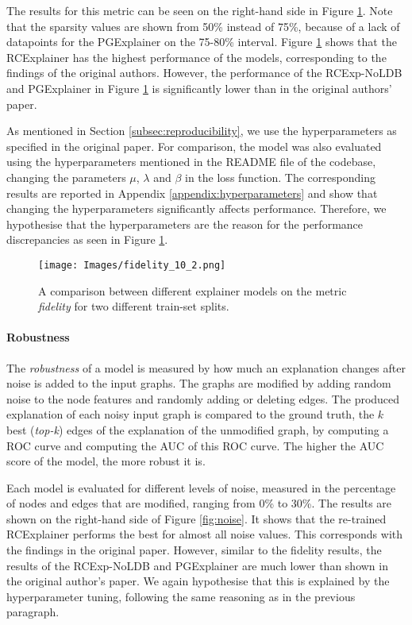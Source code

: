The results for this metric can be seen on the right-hand side in Figure \ref{fig:fidelity}. Note that the sparsity values are shown from 50\% instead of 75\%, because of a lack of datapoints for the PGExplainer on the 75-80\% interval. Figure \ref{fig:fidelity} shows that the RCExplainer has the highest performance of the models, corresponding to the findings of the original authors. However, the performance of the RCExp-NoLDB and PGExplainer in Figure \ref{fig:fidelity} is significantly lower than in the original authors' paper.  

As mentioned in Section \ref{subsec:reproducibility}, we use the hyperparameters as specified in the original paper. For comparison, the model was also evaluated using the hyperparameters mentioned in the README file of the codebase, changing the parameters $\mu$, $\lambda$ and $\beta$ in the loss function.
The corresponding results are reported in Appendix \ref{appendix:hyperparameters} and show that changing the hyperparameters significantly affects performance. Therefore, we hypothesise that the hyperparameters are the reason for the performance discrepancies as seen in Figure \ref{fig:fidelity}.

\begin{figure}[h!]
    \centerline{\texttt{[image: Images/fidelity\_10\_2.png]}}
    \caption{A comparison between different explainer models on the metric \textit{fidelity} for two different train-set splits.}
    \label{fig:fidelity}
\end{figure}

\paragraph{Robustness}
The \textit{robustness} of a model is measured by how much an explanation changes after noise is added to the input graphs. The graphs are modified by adding random noise to the node features and randomly adding or deleting edges. The produced explanation of each noisy input graph is compared to the ground truth, the $k$ best (\textit{top-k}) edges of the explanation of the unmodified graph, by computing a ROC curve and computing the AUC of this ROC curve. The higher the AUC score of the model, the more robust it is. 

Each model is evaluated for different levels of noise, measured in the percentage of nodes and edges that are modified, ranging from 0\% to 30\%. The results are shown on the right-hand side of Figure \ref{fig:noise}. It shows that the re-trained RCExplainer performs the best for almost all noise values. This corresponds with the findings in the original paper. However, similar to the fidelity results, the results of the RCExp-NoLDB and PGExplainer are much lower than shown in the original author’s paper. We again hypothesise that this is explained by the hyperparameter tuning, following the same reasoning as in the previous paragraph.

